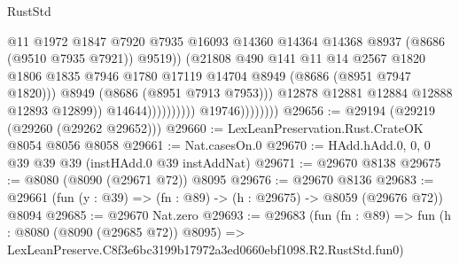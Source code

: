 \begin{lexlean}{RustStd}
\begin{coremodule}
                                                  @11
                                                  @1972
                                                  @1847
                                                  @7920
                                                  @7935
                                                  @16093
                                                  @14360
                                                  @14364
                                                  @14368
                                                  @8937
                                                  (@8686 (@9510 @7935 @7921))
                                                  @9519))
                                              (@21808
                                                @490
                                                @141
                                                @11
                                                @14
                                                @2567
                                                @1820
                                                @1806
                                                @1835
                                                @7946
                                                @1780
                                                @17119
                                                @14704
                                                @8949
                                                (@8686 (@8951 @7947 @1820)))
                                              @8949
                                              (@8686 (@8951 @7913 @7953)))
                                            @12878
                                            @12881
                                            @12884
                                            @12888
                                            @12893
                                            @12899))
                                        @14644))))))))))
                    @19746))))))))
@29656 := @29194 (@29219 (@29260 (@29262 @29652)))
@29660 := LexLeanPreservation.Rust.CrateOK @8054 @8056 @8058
@29661 := Nat.casesOn.{0}
@29670 := HAdd.hAdd.{0, 0, 0} @39 @39 @39 (instHAdd.{0} @39 instAddNat)
@29671 := @29670 @8138
@29675 := @8080 (@8090 (@29671 @72)) @8095
@29676 := @29670 @8136
@29683 := @29661 (fun (y : @39) => (fn : @89) -> (h : @29675) -> @8059 (@29676 @72)) @8094
@29685 := @29670 Nat.zero
@29693 := @29683
    (fun (fn : @89) =>
    fun (h : @8080 (@8090 (@29685 @72)) @8095) =>
    LexLeanPreserve.C8f3e6bc3199b17972a3ed0660ebf1098.R2.RustStd.fun0)

\end{coremodule}
\end{lexlean}
